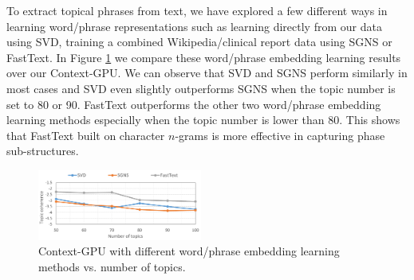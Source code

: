 \documentclass[letterpaper]{article}
\begin{document}
To extract topical phrases from text, we have explored a few different ways in learning word/phrase representations such as learning directly from our data using SVD, training a combined Wikipedia/clinical report data using SGNS or FastText. In Figure \ref{fig:embeddings} we compare these word/phrase embedding learning results over our Context-GPU. %
We can observe that SVD and SGNS perform similarly in most cases and SVD even slightly outperforms SGNS when the topic number is set to 80 or 90. FastText outperforms the other two word/phrase embedding learning methods especially when the topic number is lower than 80. This shows that FastText built on character $n$-grams is more effective in capturing phase sub-structures.

\begin{figure}[h!]
\centering
\includegraphics[width=0.48\textwidth]{model_embedding_cropped.pdf}
\caption{Context-GPU with different word/phrase embedding learning methods vs. number of topics.}
\label{fig:embeddings}
\end{figure}
\end{document}
